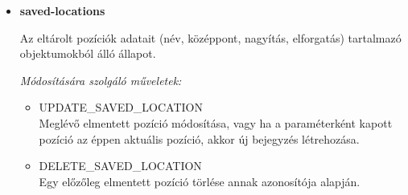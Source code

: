 \begin{itemize}
\begin{itemize}
    \end{itemize}

  \item \textbf{saved-locations}

    Az eltárolt pozíciók adatait (név, középpont, nagyítás, elforgatás)
    tartalmazó objektumokból álló állapot.

    \textit{Módosítására szolgáló műveletek:}

    \begin{itemize}
      \item UPDATE\_SAVED\_LOCATION \\
        Meglévő elmentett pozíció módosítása, vagy ha a paraméterként kapott
        pozíció az éppen aktuális pozíció, akkor új bejegyzés létrehozása.

      \item DELETE\_SAVED\_LOCATION \\
        Egy előzőleg elmentett pozíció törlése annak azonosítója alapján.
    \end{itemize}

\end{itemize}
